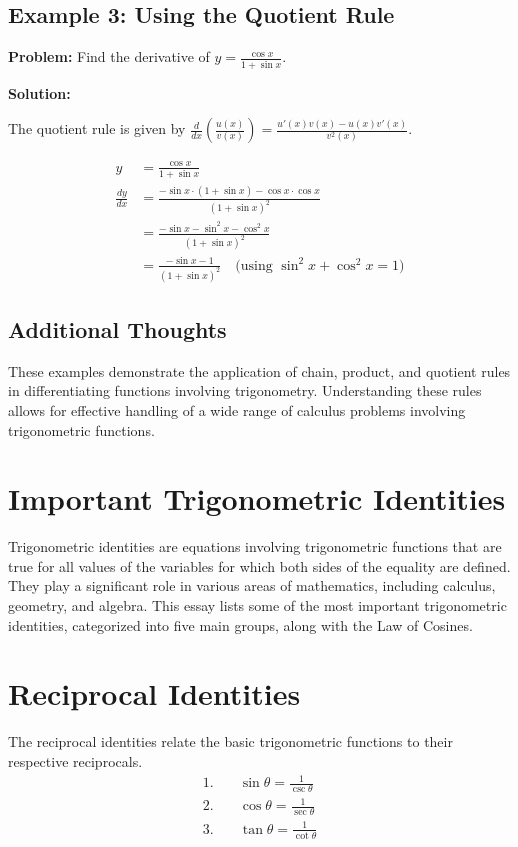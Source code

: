\documentclass[a4paper,12pt]{book}
\newcounter{problem}
\newcounter{example}
\begin{document}
\subsection*{Example 3: Using the Quotient Rule}

\textbf{Problem:} Find the derivative of \( y = \frac{\cos x}{1 + \sin x} \).

\textbf{Solution:}

The quotient rule is given by \(\frac{d}{dx} \left(\frac{u(x)}{v(x)}\right) = \frac{u'(x)v(x) - u(x)v'(x)}{v^2(x)}\).

\begin{align*}
y &= \frac{\cos x}{1 + \sin x} \\
\frac{dy}{dx} &= \frac{-\sin x \cdot (1 + \sin x) - \cos x \cdot \cos x}{(1 + \sin x)^2} \\
              &= \frac{-\sin x - \sin^2 x - \cos^2 x}{(1 + \sin x)^2} \\
              &= \frac{-\sin x - 1}{(1 + \sin x)^2} \quad \text{(using } \sin^2 x + \cos^2 x = 1\text{)}
\end{align*}

\subsection*{Additional Thoughts}

These examples demonstrate the application of chain, product, and quotient rules in differentiating functions involving trigonometry. Understanding these rules allows for effective handling of a wide range of calculus problems involving trigonometric functions.



\section{Important Trigonometric Identities}
Trigonometric identities are equations involving trigonometric functions that are true for all values of the variables for which both sides of the equality are defined. They play a significant role in various areas of mathematics, including calculus, geometry, and algebra. This essay lists some of the most important trigonometric identities, categorized into five main groups, along with the Law of Cosines.

\section*{Reciprocal Identities}
The reciprocal identities relate the basic trigonometric functions to their respective reciprocals.
\begin{align}
    1. \quad & \sin \theta = \frac{1}{\csc \theta} \\
    2. \quad & \cos \theta = \frac{1}{\sec \theta} \\
    3. \quad & \tan \theta = \frac{1}{\cot \theta}
\end{align}
\end{document}
